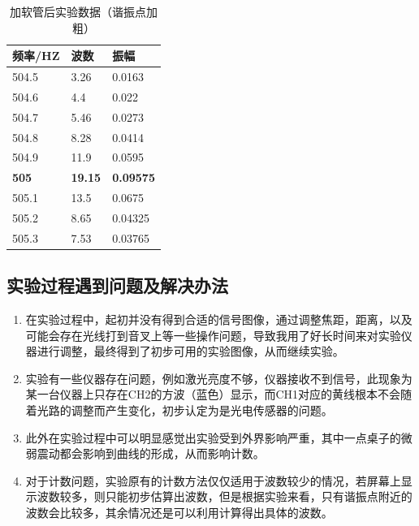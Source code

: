 \documentclass[dvipsnames, svgnames,a4paper,11pt]{article}
\begin{document}
		\begin{table}[H]
			\centering
			\begin{tabular}{|l|l|l|}
			\hline
			频率/HZ & 波数    & 振幅      \\ \hline
			504.5 & 3.26  & 0.0163 \\ \hline
			504.6 & 4.4   & 0.022  \\ \hline
			504.7 & 5.46  & 0.0273 \\ \hline
			504.8 & 8.28  & 0.0414 \\ \hline
			504.9 & 11.9  & 0.0595 \\ \hline
			\textbf{505} & \textbf{19.15} & \textbf{0.09575} \\ \hline
			505.1 & 13.5  & 0.0675 \\ \hline
			505.2 & 8.65  & 0.04325 \\ \hline
			505.3 & 7.53  & 0.03765 \\ \hline
			\end{tabular}
			\caption{加软管后实验数据（谐振点加粗）}
			\label{加软管后实验数据}
		\end{table}
	
		
	
	
	

	\subsection{实验过程遇到问题及解决办法}
	\begin{enumerate}
		\item 在实验过程中，起初并没有得到合适的信号图像，通过调整焦距，距离，以及可能会存在光线打到音叉上等一些操作问题，导致我用了好长时间来对实验仪器进行调整，最终得到了初步可用的实验图像，从而继续实验。
		\item 实验有一些仪器存在问题，例如激光亮度不够，仪器接收不到信号，此现象为某一台仪器上只存在CH2的方波（蓝色）显示，而CH1对应的黄线根本不会随着光路的调整而产生变化，初步认定为是光电传感器的问题。
		\item 此外在实验过程中可以明显感觉出实验受到外界影响严重，其中一点桌子的微弱震动都会影响到曲线的形成，从而影响计数。
		\item 对于计数问题，实验原有的计数方法仅仅适用于波数较少的情况，若屏幕上显示波数较多，则只能初步估算出波数，但是根据实验来看，只有谐振点附近的波数会比较多，其余情况还是可以利用计算得出具体的波数。
	\end{enumerate}

	
	
	\clearpage
	
\end{document}
